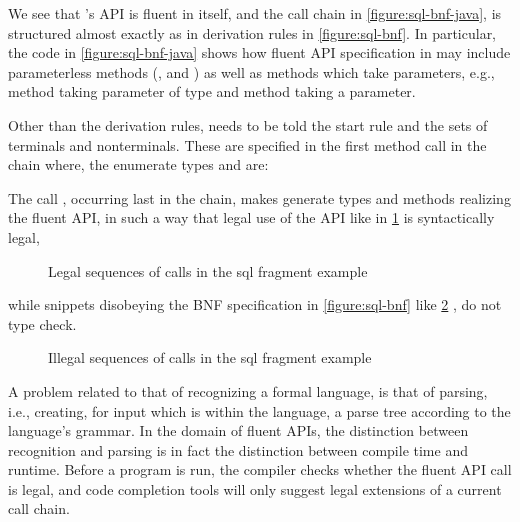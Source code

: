 We see that \Fajita's API is fluent in itself, and the 
  call chain in \cref{figure:sql-bnf-java}, is structured almost
  exactly as in derivation rules in \cref{figure:sql-bnf}.
In particular, the code in \cref{figure:sql-bnf-java} shows how fluent API specification in \Fajita
  may include parameterless methods (,  and ) as well as methods which 
  take parameters, e.g., method  taking parameter of type  and 
    method  taking a  parameter.

Other than the derivation rules, \Fajita  needs to be told the start rule
  and the sets of terminals and nonterminals.
These are specified in the first method call in the chain where, 
  the enumerate types  and  are:

\begin{quote}
  \parbox[c]{43ex}{}
\end{quote}

The call , occurring last in the chain, makes \Fajita generate types
and methods realizing the fluent API, in such a way that legal use of the API
like in \cref{figure:sql:legal} is syntactically legal,

\begin{figure}[H]
  \caption{\label{figure:sql:legal}
  Legal sequences of calls in the sql fragment example}
\end{figure}

while snippets disobeying the BNF specification in \cref{figure:sql-bnf} like
\cref{figure:sql:illegal} , do not type check.

\begin{figure}[H]
  \caption{\label{figure:sql:illegal}
  Illegal sequences of calls in the sql fragment example}
\end{figure}

A problem related to that of recognizing a formal language,
is that of parsing, i.e., creating, for input which is within the language,
a parse tree according to the language's grammar.
In the domain of fluent APIs, the distinction between recognition and parsing
is in fact the distinction between compile time and runtime.
Before a program is run, the compiler checks whether the fluent API call is
legal, and code completion tools will only suggest legal extensions of a
current call chain.

